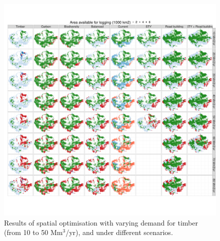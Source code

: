 \documentclass{article}
\begin{document}
\begin{figure}
    \centering
    \includegraphics[width=\linewidth]{graphs/mapsChangeDemand.pdf}
    \caption{Results of spatial optimisation with varying demand for timber (from 10 to 50 Mm$^3$/yr), and under different scenarios. }
    \label{fig:mapsIncDemand}
\end{figure}
\end{document}

